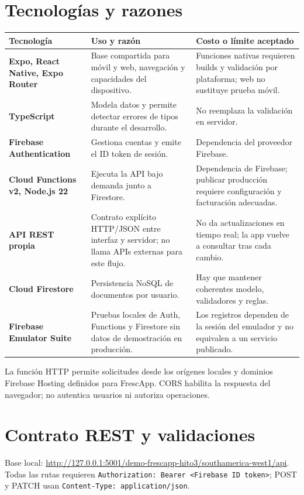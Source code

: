 \documentclass[11pt,a4paper]{article}
\newcommand{\pathcode}[1]{\texttt{\small #1}}
\begin{document}
\section{Tecnologías y razones}
\begin{tabularx}{\textwidth}{>{\bfseries}p{3.1cm}YY}
Tecnología & Uso y razón & Costo o límite aceptado\\
\midrule
Expo, React Native, Expo Router & Base compartida para móvil y web, navegación y capacidades del dispositivo. & Funciones nativas requieren builds y validación por plataforma; web no sustituye prueba móvil.\\
TypeScript & Modela datos y permite detectar errores de tipos durante el desarrollo. & No reemplaza la validación en servidor.\\
Firebase Authentication & Gestiona cuentas y emite el ID token de sesión. & Dependencia del proveedor Firebase.\\
Cloud Functions v2, Node.js 22 & Ejecuta la API bajo demanda junto a Firestore. & Dependencia de Firebase; publicar producción requiere configuración y facturación adecuadas.\\
API REST propia & Contrato explícito HTTP/JSON entre interfaz y servidor; no llama APIs externas para este flujo. & No da actualizaciones en tiempo real; la app vuelve a consultar tras cada cambio.\\
Cloud Firestore & Persistencia NoSQL de documentos por usuario. & Hay que mantener coherentes modelo, validadores y reglas.\\
Firebase Emulator Suite & Pruebas locales de Auth, Functions y Firestore sin datos de demostración en producción. & Los registros dependen de la sesión del emulador y no equivalen a un servicio publicado.\\
\end{tabularx}

La función HTTP permite solicitudes desde los orígenes locales y dominios Firebase Hosting definidos para FrescApp. CORS habilita la respuesta del navegador; no autentica usuarios ni autoriza operaciones.

\section{Contrato REST y validaciones}
Base local: \url{http://127.0.0.1:5001/demo-frescapp-hito3/southamerica-west1/api}. Todas las rutas requieren \pathcode{Authorization: Bearer <Firebase ID token>}; POST y PATCH usan \pathcode{Content-Type: application/json}.
\end{document}

